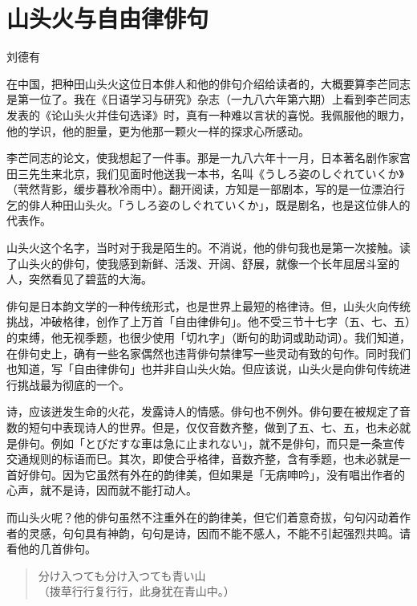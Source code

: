 \chapter{\FK 山头火与自由律俳句}
{\FS

    \hfill 刘德有

    \bigskip

    在中国，把种田山头火这位日本俳人和他的俳句介绍给读者的，大概要算李芒同志是第一位了。我在《日语学习与研究》杂志（一九八六年第六期）上看到李芒同志发表的《论山头火并佳句选译》时，真有一种难以言状的喜悦。我佩服他的眼力，他的学识，他的胆量，更为他那一颗火一样的探求心所感动。

    李芒同志的论文，使我想起了一件事。那是一九八六年十一月，日本著名剧作家宫田三先生来北京，我们见面时他送我一本书，名叫《{\FM うしろ姿のしぐれていくか}》（茕然背影，缓步暮秋冷雨中\footnotemark[1]）。翻开阅读，方知是一部剧本，写的是一位漂泊行乞的俳人种田山头火。「{\FM うしろ姿のしぐれていくか}」，既是剧名，也是这位俳人的代表作。


    山头火这个名字，当时对于我是陌生的。不消说，他的俳句我也是第一次接触。读了山头火的俳句，使我感到新鲜、活泼、开阔、舒展，就像一个长年屈居斗室的人，突然看见了碧蓝的大海。

    俳句是日本韵文学的一种传统形式，也是世界上最短的格律诗。但，山头火向传统挑战，冲破格律，创作了上万首「自由律俳句」。他不受三节十七字（五、七、五）的束缚，他无视季题，也很少使用「切れ字」（断句的助词或助动词）。我们知道，在俳句史上，确有一些名家偶然也违背俳句禁律写一些灵动有致的句作。同时我们也知道，写「自由律俳句」也并非自山头火始。但应该说，山头火是向俳句传统进行挑战最为彻底的一个。

    诗，应该迸发生命的火花，发露诗人的情感。俳句也不例外。俳句要在被规定了音数的短句中表现诗人的世界。但是，仅仅音数齐整，做到了五、七、五，也未必就是俳句。例如「{\FM とびだすな車は急に止まれない}」，就不是俳句，而只是一条宣传交通规则的标语而巳。其次，即使合乎格律，音数齐整，含有季题，也未必就是一首好俳句。因为它虽然有外在的韵律美，但如果是「无病呻吟」，没有唱出作者的心声，就不是诗，因而就不能打动人。

    而山头火呢？他的俳句虽然不注重外在的韵律美，但它们着意奇拔，句句闪动着作者的灵感，句句具有神韵，句句是诗，因而不能不感人，不能不引起强烈共鸣。请看他的几首俳句。
    \begin{quote}
        {\FM 分け入つても分け入つても青い山}\\
        （拨草行行复行行，此身犹在青山中。）


\end{quote}}
